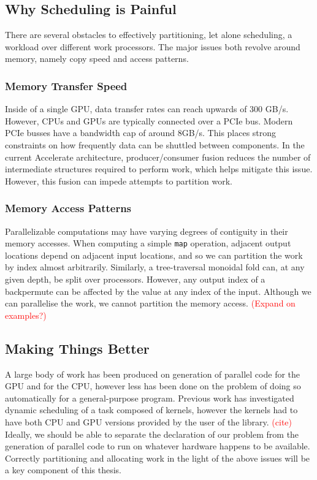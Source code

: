 \documentclass[a4paper,12pt]{article}
\newcommand{\red}[1]{\textcolor{red}{#1}}
\begin{document}
\subsection{Why Scheduling is Painful}
There are several obstacles to effectively partitioning, let alone scheduling, a workload over different work processors. 
The major issues both revolve around memory, namely copy speed and access patterns. 

\subsubsection*{Memory Transfer Speed} 
Inside of a single GPU, data transfer rates can reach upwards of 300 GB/s. \citep{gtx-780-spec}
However, CPUs and GPUs are typically connected over a PCIe bus.
Modern PCIe busses have a bandwidth cap of around 8GB/s. \citep{pcie-3-faq}
This places strong constraints on how frequently data can be shuttled between components. 
In the current Accelerate architecture, producer/consumer fusion reduces the number of intermediate structures required to perform work, which helps mitigate this issue. 
However, this fusion can impede attempts to partition work.

\subsubsection*{Memory Access Patterns} 
Parallelizable computations may have varying degrees of contiguity in their memory accesses. 
When computing a simple \texttt{map} operation, adjacent output locations depend on adjacent input locations, and so we can partition the work by index almost arbitrarily. 
Similarly, a tree-traversal monoidal fold can, at any given depth, be split over processors. 
However, any output index of a backpermute can be affected by the value at any index of the input. 
Although we can parallelise the work, we cannot partition the memory access. \red{(Expand on examples?)}

\subsection{Making Things Better}

A large body of work has been produced on generation of parallel code for the GPU and for the CPU, \citep{lee_transparent_2013} however less has been done on the problem of doing so automatically for a general-purpose program. 
Previous work has investigated dynamic scheduling of a task composed of kernels, however the kernels had to have both CPU and GPU versions provided by the user of the library. 
\red{(cite)} 
Ideally, we should be able to separate the declaration of our problem from the generation of parallel code to run on whatever hardware happens to be available.
Correctly partitioning and allocating work in the light of the above issues will be a key component of this thesis.
\end{document}

